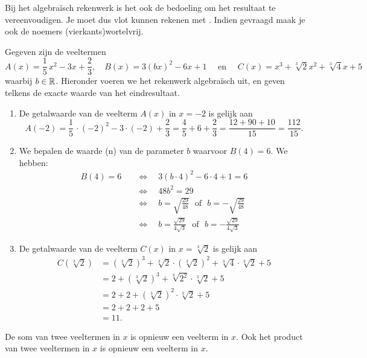 \documentclass{ximera}
\begin{document}
Bij het algebra\"isch rekenwerk is het ook de bedoeling om het resultaat te vereenvoudigen. Je moet dus vlot kunnen rekenen met . 
Indien gevraagd maak je ook de noemers (vierkants)wortelvrij. 

\begin{example}
Gegeven zijn de veeltermen
\[
A(x) = \frac{1}{5}\,x^2-3x+\frac{2}{3}, \quad B(x) = 3(bx)^2-6x+1 \quad \text{ en } \quad C(x) = x^3 + \sqrt[3]{2} x^2 + \sqrt[3]{4}x+5
\]
waarbij $b \in \mathbb{R}$. Hieronder voeren we het rekenwerk algebra\"isch uit, en geven telkens de exacte waarde van het eindresultaat. 
\begin{enumerate}

\item
De getalwaarde van de veelterm $A(x)$ in $x = -2$ is gelijk aan
\[
A(-2) = \frac{1}{5}\,\cdot (-2)^2-3\cdot(-2)+\frac{2}{3} = \frac{4}{5} +6+ \frac{2}{3} = \frac{12 + 90 + 10}{15} = \frac{112}{15}.
\]
\item
We bepalen de waarde (n) van de parameter $b$ waarvoor $B(4) = 6$. We hebben:
\begin{align*}
B(4) = 6 \quad 
& \Leftrightarrow \quad 3(b\cdot 4)^2-6\cdot 4+1 = 6 \\ 
& \Leftrightarrow \quad 48b^2 = 29 \\
& \Leftrightarrow \quad b = \sqrt{\frac{29}{48}} \,\,\text{ of }\,\, b = - \sqrt{\frac{29}{48}} \\
& \Leftrightarrow \quad b = \frac{\sqrt{29}}{4\sqrt{3}} \,\,\text{ of }\,\, b = - \frac{\sqrt{29}}{4\sqrt{3}}
\end{align*}
\item
De getalwaarde van de veelterm $C(x)$ in $x = \sqrt[3]{2}$ is gelijk aan
\begin{align*}
C(\sqrt[3]{2}) & = (\sqrt[3]{2})^3 + \sqrt[3]{2}\cdot(\sqrt[3]{2})^2 + \sqrt[3]{4}\cdot \sqrt[3]{2}+5 \\
& = 2 + (\sqrt[3]{2})^3 + \sqrt[3]{2^2}\cdot \sqrt[3]{2} + 5 \\
& = 2 + 2 + (\sqrt[3]{2})^2 \cdot \sqrt[3]{2} + 5 \\
& = 2 + 2 + 2 + 5 \\
& = 11.
\end{align*}
\end{enumerate}
\end{example}

De som van twee veeltermen in $x$ is opnieuw een veelterm in $x$. Ook het product van twee veeltermen in $x$ is opnieuw een veelterm in $x$. 
\end{document}
